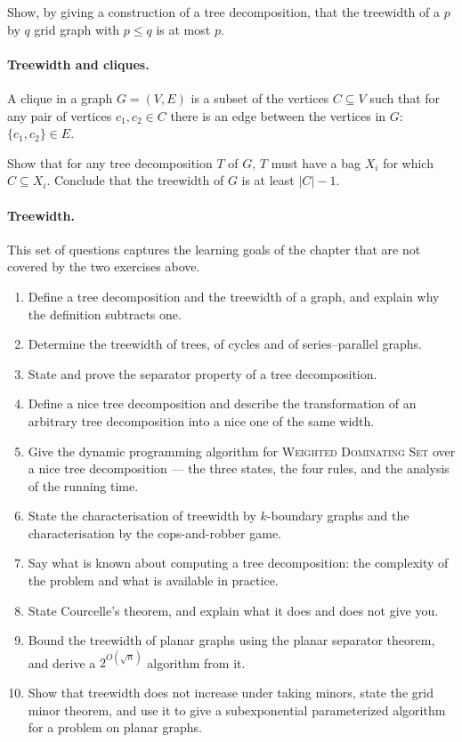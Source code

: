 Show, by giving a construction of a tree decomposition, that the treewidth of a
$p$ by $q$ grid graph with $p \le q$ is at most $p$.

\paragraph{Treewidth and cliques.}
A clique in a graph $G = (V,E)$ is a subset of the vertices $C \subseteq V$ such
that for any pair of vertices $c_1, c_2 \in C$ there is an edge between the
vertices in $G$: $\{c_1,c_2\} \in E$.

Show that for any tree decomposition $T$ of $G$, $T$ must have a bag $X_i$ for
which $C \subseteq X_i$. Conclude that the treewidth of $G$ is at least
$|C| - 1$.

\paragraph{Treewidth.}
This set of questions captures the learning goals of the chapter that are not
covered by the two exercises above.
\begin{enumerate}
  \item Define a tree decomposition and the treewidth of a graph, and explain
        why the definition subtracts one.
  \item Determine the treewidth of trees, of cycles and of series--parallel
        graphs.
  \item State and prove the separator property of a tree decomposition.
  \item Define a nice tree decomposition and describe the transformation of an
        arbitrary tree decomposition into a nice one of the same width.
  \item Give the dynamic programming algorithm for \textsc{Weighted Dominating
        Set} over a nice tree decomposition --- the three states, the four
        rules, and the analysis of the running time.
  \item State the characterisation of treewidth by $k$-boundary graphs and the
        characterisation by the cops-and-robber game.
  \item Say what is known about computing a tree decomposition: the complexity
        of the problem and what is available in practice.
  \item State Courcelle's theorem, and explain what it does and does not give
        you.
  \item Bound the treewidth of planar graphs using the planar separator
        theorem, and derive a $2^{O(\sqrt n)}$ algorithm from it.
  \item Show that treewidth does not increase under taking minors, state the
        grid minor theorem, and use it to give a subexponential parameterized
        algorithm for a problem on planar graphs.
\end{enumerate}

